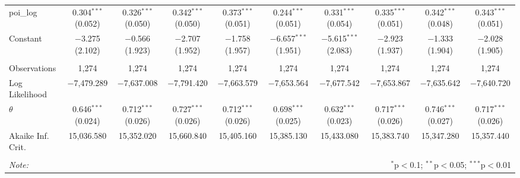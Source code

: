 \begin{table}[!htbp]
\begin{tabular}{@{\extracolsep{1pt}}lccccccccc}
  poi\_log & 0.304$^{***}$ (0.052) & 0.326$^{***}$ (0.050) & 0.342$^{***}$ (0.050) & 0.373$^{***}$ (0.051) & 0.244$^{***}$ (0.051) & 0.331$^{***}$ (0.054) & 0.335$^{***}$ (0.051) & 0.342$^{***}$ (0.048) & 0.343$^{***}$ (0.051) \\ 
  Constant & $-$3.275 (2.102) & $-$0.566 (1.923) & $-$2.707 (1.952) & $-$1.758 (1.957) & $-$6.657$^{***}$ (1.951) & $-$5.615$^{***}$ (2.083) & $-$2.923 (1.937) & $-$1.333 (1.904) & $-$2.028 (1.905) \\ 
 \hline \\[-1.8ex] 
Observations & 1,274 & 1,274 & 1,274 & 1,274 & 1,274 & 1,274 & 1,274 & 1,274 & 1,274 \\ 
Log Likelihood & $-$7,479.289 & $-$7,637.008 & $-$7,791.420 & $-$7,663.579 & $-$7,653.564 & $-$7,677.542 & $-$7,653.867 & $-$7,635.642 & $-$7,640.720 \\ 
$\theta$ & 0.646$^{***}$  (0.024) & 0.712$^{***}$  (0.026) & 0.727$^{***}$  (0.026) & 0.712$^{***}$  (0.026) & 0.698$^{***}$  (0.025) & 0.632$^{***}$  (0.023) & 0.717$^{***}$  (0.026) & 0.746$^{***}$  (0.027) & 0.717$^{***}$  (0.026) \\ 
Akaike Inf. Crit. & 15,036.580 & 15,352.020 & 15,660.840 & 15,405.160 & 15,385.130 & 15,433.080 & 15,383.740 & 15,347.280 & 15,357.440 \\ 
\hline 
\hline \\[-1.8ex] 
\textit{Note:}  & \multicolumn{9}{r}{$^{*}$p$<$0.1; $^{**}$p$<$0.05; $^{***}$p$<$0.01} \\ 
\end{tabular} 
\end{table} 
